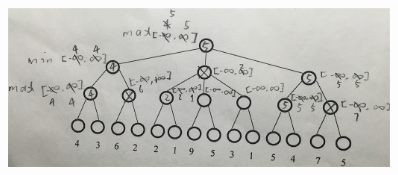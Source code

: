 \documentclass[12pt]{article}
\begin{document}
\begin{singlespace}
\begin{enumerate}
\begin{itemize}
	\begin{figure}[h]
	\centering
	\includegraphics[width=0.9\textwidth]{3b} 
	\end{figure}
	\end{itemize}
\end{enumerate}
\end{singlespace}

\clearpage

\printbibliography
\end{document}
